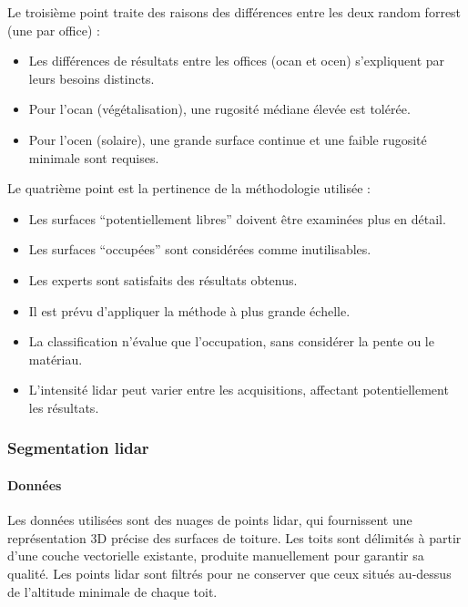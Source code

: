 \par{Le troisième point traite des raisons des différences entre les deux random forrest (une par office) :}
\begin{itemize}
    \item Les différences de résultats entre les offices (\acrshort{ocan} et \acrshort{ocen}) s'expliquent par leurs besoins distincts.
    \item Pour l'\acrshort{ocan} (végétalisation), une rugosité médiane élevée est tolérée.
    \item Pour l'\acrshort{ocen} (solaire), une grande surface continue et une faible rugosité minimale sont requises.
\end{itemize}

\par{Le quatrième point est la pertinence de la méthodologie utilisée :}
\begin{itemize}
    \item Les surfaces ``potentiellement libres'' doivent être examinées plus en détail.
    \item Les surfaces ``occupées'' sont considérées comme inutilisables.
    \item Les experts sont satisfaits des résultats obtenus.
    \item Il est prévu d'appliquer la méthode à plus grande échelle.
    \item La classification n'évalue que l'occupation, sans considérer la pente ou le matériau.
    \item L'intensité \gls{lidar} peut varier entre les acquisitions, affectant potentiellement les résultats.
\end{itemize}

\subsubsection{Segmentation \gls{lidar}}

\paragraph{Données}
\par{Les données utilisées sont des nuages de points \gls{lidar}, qui fournissent une représentation 3D précise des surfaces de toiture. Les toits sont délimités à partir d'une couche vectorielle existante, produite manuellement pour garantir sa qualité. Les points \gls{lidar} sont filtrés pour ne conserver que ceux situés au-dessus de l'altitude minimale de chaque toit.}


